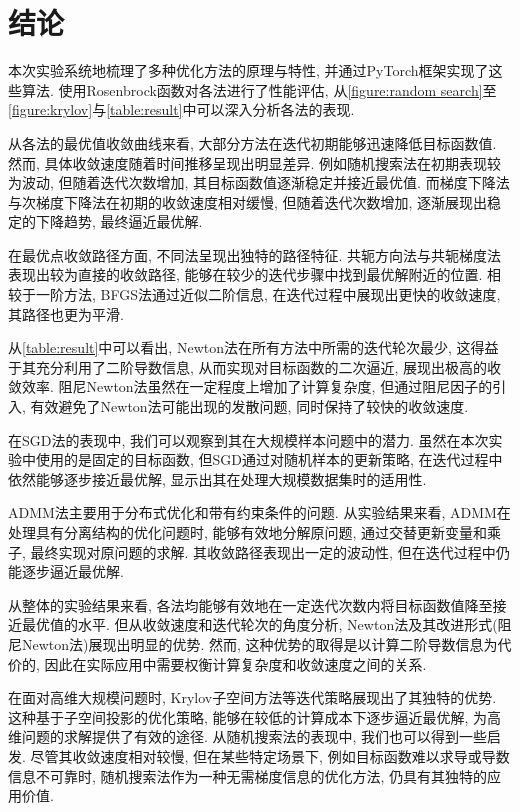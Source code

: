 \section{结论}

本次实验系统地梳理了多种优化方法的原理与特性, 并通过PyTorch框架实现了这些算法.
使用Rosenbrock函数对各法进行了性能评估, 从\cref{figure:random search}至\cref{figure:krylov}与\cref{table:result}中可以深入分析各法的表现.

从各法的最优值收敛曲线来看, 大部分方法在迭代初期能够迅速降低目标函数值.
然而, 具体收敛速度随着时间推移呈现出明显差异.
例如随机搜索法在初期表现较为波动, 但随着迭代次数增加, 其目标函数值逐渐稳定并接近最优值.
而梯度下降法与次梯度下降法在初期的收敛速度相对缓慢, 但随着迭代次数增加, 逐渐展现出稳定的下降趋势, 最终逼近最优解.

在最优点收敛路径方面, 不同法呈现出独特的路径特征.
共轭方向法与共轭梯度法表现出较为直接的收敛路径, 能够在较少的迭代步骤中找到最优解附近的位置.
相较于一阶方法, BFGS法通过近似二阶信息, 在迭代过程中展现出更快的收敛速度, 其路径也更为平滑.

从\cref{table:result}中可以看出, Newton法在所有方法中所需的迭代轮次最少, 这得益于其充分利用了二阶导数信息, 从而实现对目标函数的二次逼近, 展现出极高的收敛效率.
阻尼Newton法虽然在一定程度上增加了计算复杂度, 但通过阻尼因子的引入, 有效避免了Newton法可能出现的发散问题, 同时保持了较快的收敛速度.

在SGD法的表现中, 我们可以观察到其在大规模样本问题中的潜力.
虽然在本次实验中使用的是固定的目标函数, 但SGD通过对随机样本的更新策略, 在迭代过程中依然能够逐步接近最优解, 显示出其在处理大规模数据集时的适用性.

ADMM法主要用于分布式优化和带有约束条件的问题.
从实验结果来看, ADMM在处理具有分离结构的优化问题时, 能够有效地分解原问题, 通过交替更新变量和乘子, 最终实现对原问题的求解.
其收敛路径表现出一定的波动性, 但在迭代过程中仍能逐步逼近最优解.

从整体的实验结果来看, 各法均能够有效地在一定迭代次数内将目标函数值降至接近最优值的水平.
但从收敛速度和迭代轮次的角度分析, Newton法及其改进形式(阻尼Newton法)展现出明显的优势.
然而, 这种优势的取得是以计算二阶导数信息为代价的, 因此在实际应用中需要权衡计算复杂度和收敛速度之间的关系.

在面对高维大规模问题时, Krylov子空间方法等迭代策略展现出了其独特的优势.
这种基于子空间投影的优化策略, 能够在较低的计算成本下逐步逼近最优解, 为高维问题的求解提供了有效的途径.
从随机搜索法的表现中, 我们也可以得到一些启发.
尽管其收敛速度相对较慢, 但在某些特定场景下, 例如目标函数难以求导或导数信息不可靠时, 随机搜索法作为一种无需梯度信息的优化方法, 仍具有其独特的应用价值.
